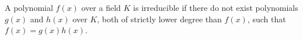 A polynomial $f(x)$ over a field $K$ is irreducible if there do not exist polynomials $g(x)$ and $h(x)$ over $K$, both of strictly lower degree than $f(x)$, such that $f(x) = g(x)h(x)$.
